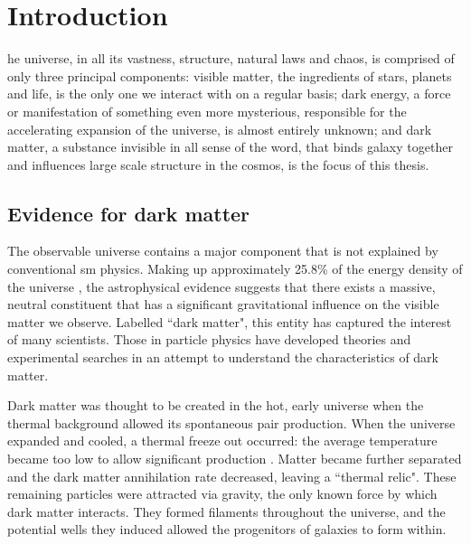 %
%
\let\textcircled=\pgftextcircled
\chapter{Introduction}
\label{chap:intro}


he universe, in all its vastness, structure, natural laws and chaos, is comprised of only three principal components: visible matter, the ingredients of stars, planets and life, is the only one we interact with on a regular basis; dark energy, a force or manifestation of something even more mysterious, responsible for the accelerating expansion of the universe, is almost entirely unknown; and dark matter, a substance invisible in all sense of the word, that binds galaxy together and influences large scale structure in the cosmos, is the focus of this thesis.


\section{Evidence for dark matter}
\label{sec:intro_dm_evidence}

The observable universe contains a major component that is not explained by conventional \acrfull{sm} physics. Making up approximately 25.8\% of the energy density of the universe \cite{2016AnA...594A..13P}, the astrophysical evidence suggests that there exists a massive, neutral constituent that has a significant gravitational influence on the visible matter we observe. Labelled ``dark matter", this entity has captured the interest of many scientists. Those in particle physics have developed theories and experimental searches in an attempt to understand the characteristics of dark matter.

Dark matter was thought to be created in the hot, early universe when the thermal background allowed its spontaneous pair production. When the universe expanded and cooled, a thermal freeze out occurred: the average temperature became too low to allow significant production \cite{Baldes:2017gzw}. Matter became further separated and the dark matter annihilation rate decreased, leaving a ``thermal relic". These remaining particles were attracted via gravity, the only known force by which dark matter interacts. They formed filaments throughout the universe, and the potential wells they induced allowed the progenitors of galaxies to form within.

